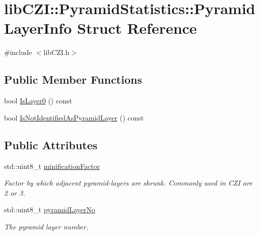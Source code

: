 \hypertarget{structlib_c_z_i_1_1_pyramid_statistics_1_1_pyramid_layer_info}{}\section{lib\+C\+ZI\+:\+:Pyramid\+Statistics\+:\+:Pyramid\+Layer\+Info Struct Reference}
\label{structlib_c_z_i_1_1_pyramid_statistics_1_1_pyramid_layer_info}


{\ttfamily \#include $<$lib\+C\+Z\+I.\+h$>$}

\subsection*{Public Member Functions}
\begin{DoxyCompactItemize}
\item 
bool \hyperlink{structlib_c_z_i_1_1_pyramid_statistics_1_1_pyramid_layer_info_a9cafde3541c9752058dcbeaaa73d4686}{Is\+Layer0} () const
\item 
bool \hyperlink{structlib_c_z_i_1_1_pyramid_statistics_1_1_pyramid_layer_info_afc9992be68effd61fa8ff828c3fe467d}{Is\+Not\+Identified\+As\+Pyramid\+Layer} () const
\end{DoxyCompactItemize}
\subsection*{Public Attributes}
\begin{DoxyCompactItemize}
\item 
\mbox{\label{structlib_c_z_i_1_1_pyramid_statistics_1_1_pyramid_layer_info_a397023f140015ffb12dc87bdfd721dc1}} 
std\+::uint8\+\_\+t \hyperlink{structlib_c_z_i_1_1_pyramid_statistics_1_1_pyramid_layer_info_a397023f140015ffb12dc87bdfd721dc1}{minification\+Factor}
\begin{DoxyCompactList}\small\item\em Factor by which adjacent pyramid-\/layers are shrunk. Commonly used in C\+ZI are 2 or 3. \end{DoxyCompactList}\item 
\mbox{\label{structlib_c_z_i_1_1_pyramid_statistics_1_1_pyramid_layer_info_ad6b9ffa4916540dc3749711678cf272b}} 
std\+::uint8\+\_\+t \hyperlink{structlib_c_z_i_1_1_pyramid_statistics_1_1_pyramid_layer_info_ad6b9ffa4916540dc3749711678cf272b}{pyramid\+Layer\+No}
\begin{DoxyCompactList}\small\item\em The pyramid layer number. \end{DoxyCompactList}\end{DoxyCompactItemize}


